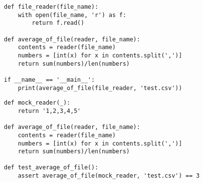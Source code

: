 \begin{programcode}{}
\begin{verbatim}
def file_reader(file_name):
    with open(file_name, 'r') as f:
        return f.read()

def average_of_file(reader, file_name):
    contents = reader(file_name)
    numbers = [int(x) for x in contents.split(',')]
    return sum(numbers)/len(numbers)

if __name__ == '__main__':
    print(average_of_file(file_reader, 'test.csv'))
\end{verbatim}
\end{programcode}


\begin{programcode}{}
\begin{verbatim}
def mock_reader(_):
    return '1,2,3,4,5'

def average_of_file(reader, file_name):
    contents = reader(file_name)
    numbers = [int(x) for x in contents.split(',')]
    return sum(numbers)/len(numbers)

def test_average_of_file():
    assert average_of_file(mock_reader, 'test.csv') == 3
\end{verbatim}
\end{programcode}
 
